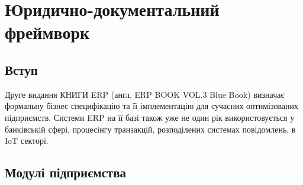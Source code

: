 \chapter{Юридично-документальний фреймворк}

\section{Вступ}

Друге видання КНИГИ ERP (англ. ERP BOOK VOL.3 Blue Book) визначає формальну
бізнес специфікацію та її імплементацію для сучасних оптимізованих підприємств.
Системи ERP на її базі також уже не один рік використовується у банківській сфері,
процесінгу транзакцій, розподілених системах повідомлень, в IoT секторі.

\section{Модулі підприємства}

